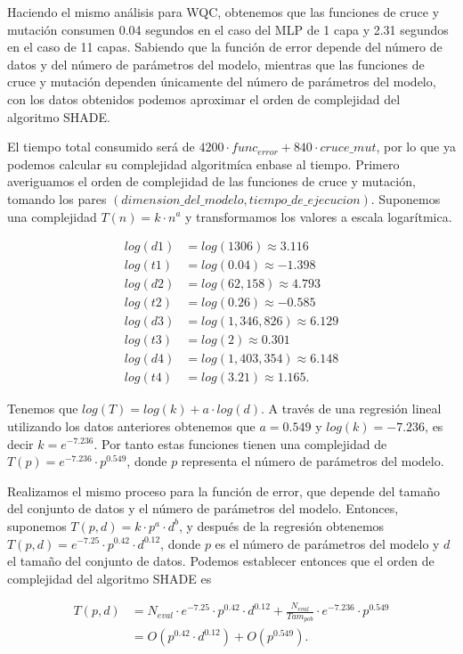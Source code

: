 Haciendo el mismo análisis para WQC, obtenemos que las funciones de cruce y mutación consumen 0.04 segundos en el caso del MLP de 1 capa y 2.31 segundos en el caso de 11 capas. Sabiendo que la función de error depende del número de datos y del número de parámetros del modelo, mientras que las funciones de cruce y mutación dependen únicamente del número de parámetros del modelo, con los datos obtenidos podemos aproximar el orden de complejidad del algoritmo SHADE.

El tiempo total consumido será de $4200 \cdot func_{error} + 840 \cdot cruce\_mut$, por lo que ya podemos calcular su complejidad algoritmíca enbase al tiempo. Primero averiguamos el orden de complejidad de las funciones de cruce y mutación, tomando los pares $(dimension\_del\_modelo, tiempo\_de\_ejecucion)$. Suponemos una complejidad $T(n)=k \cdot n^a$ y transformamos los valores a escala logarítmica.

\begin{align*}
log(d1)&=log(1306)\approx3.116\\
log(t1)&=log(0.04)\approx -1.398\\
log(d2)&=log(62,158)\approx4.793\\
log(t2)&=log(0.26)\approx-0.585\\
log(d3)&=log(1,346,826)\approx6.129\\
log(t3)&=log(2)\approx0.301\\
log(d4)&=log(1,403,354)\approx6.148\\
log(t4)&=log(3.21)\approx1.165.
\end{align*}


Tenemos que $log(T)=log(k) + a \cdot log(d)$. A través de una regresión lineal utilizando los datos anteriores obtenemos que $a = 0.549$ y $log(k)=-7.236$, es decir $k=e^{-7.236}$. Por tanto estas funciones tienen una complejidad de $T(p) = e^{-7.236}\cdot p^{0.549}$, donde $p$ representa el número de parámetros del modelo.

Realizamos el mismo proceso para la función de error, que depende del tamaño del conjunto de datos y el número de parámetros del modelo. Entonces, suponemos $T(p,d)=k \cdot p^a \cdot d^b$, y después de la regresión obtenemos $T(p,d)=e^{-7.25} \cdot p^{0.42} \cdot d^{0.12}$, donde $p$ es el número de parámetros del modelo y $d$ el tamaño del conjunto de datos. Podemos establecer entonces que el orden de complejidad del algoritmo SHADE es


\begin{align*}
T(p,d)&= N_{eval} \cdot e^{-7.25} \cdot p^{0.42} \cdot d^{0.12} + \frac{N_{eval}}{Tam_{pob}} \cdot e^{-7.236}\cdot p^{0.549} \\
          &= O( p^{0.42} \cdot d^{0.12}) + O(p^{0.549}).
\end{align*}

